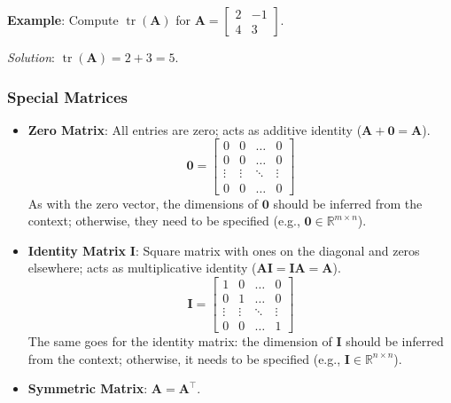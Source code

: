 \begin{exampleBox}
    \textbf{Example}: Compute $ \operatorname{tr}(\mathbf{A}) $ for $ \mathbf{A} = \begin{bmatrix}2 & -1\\4 & 3\end{bmatrix} $.

    \emph{Solution}: $ \operatorname{tr}(\mathbf{A}) = 2 + 3 = 5 $.
\end{exampleBox}

\subsubsection{Special Matrices}
\begin{itemize}
    \item \textbf{Zero Matrix}: All entries are zero; acts as additive identity ($ \mathbf{A} + \mathbf{0} = \mathbf{A} $).
    \begin{equation*}
        \mathbf{0} = \begin{bmatrix}0 & 0 & \ldots & 0\\0 & 0 & \ldots & 0\\ \vdots & \vdots & \ddots & \vdots\\0 & 0 & \ldots & 0\end{bmatrix}
    \end{equation*}
    As with the zero vector, the dimensions of $ \mathbf{0} $ should be inferred from the context; otherwise, they need to be specified (e.g., $ \mathbf{0} \in \mathbb{R}^{m \times n} $).
    \item \textbf{Identity Matrix} $ \mathbf{I} $: Square matrix with ones on the diagonal and zeros elsewhere; acts as multiplicative identity ($ \mathbf{A}\mathbf{I} = \mathbf{I}\mathbf{A} = \mathbf{A} $).
    \begin{equation*}
        \mathbf{I} = \begin{bmatrix}1 & 0 & \ldots & 0\\0 & 1 & \ldots & 0\\ \vdots & \vdots & \ddots & \vdots\\0 & 0 & \ldots & 1\end{bmatrix}
    \end{equation*}
    The same goes for the identity matrix: the dimension of $ \mathbf{I} $ should be inferred from the context; otherwise, it needs to be specified (e.g., $ \mathbf{I} \in \mathbb{R}^{n \times n} $).
    \item \textbf{Symmetric Matrix}: $ \mathbf{A} = \mathbf{A}^\top $.

\end{itemize}
